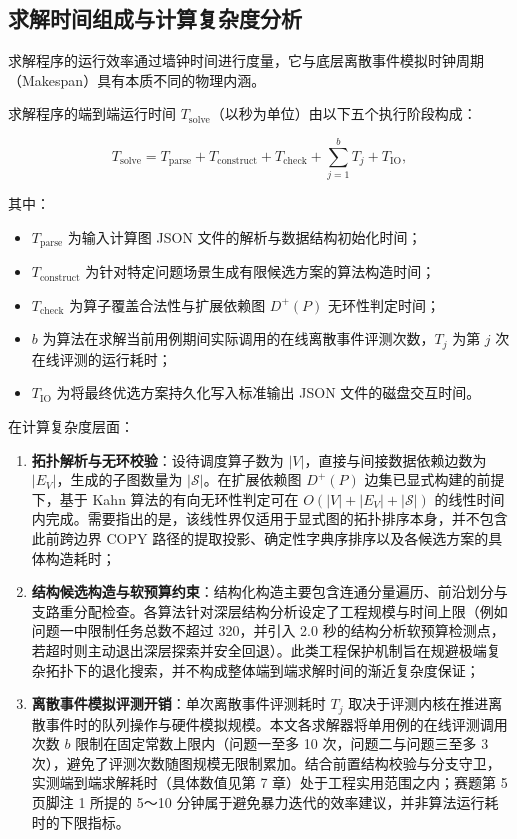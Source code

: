 \documentclass[anonymous,withtoc]{gmcm2026}
\providecommand{\tightlist}{\setlength{\itemsep}{0pt}\setlength{\parskip}{0pt}}
\begin{document}
\subsection{求解时间组成与计算复杂度分析}

求解程序的运行效率通过墙钟时间进行度量，它与底层离散事件模拟时钟周期（Makespan）具有本质不同的物理内涵。

求解程序的端到端运行时间 \(T_{\mathrm{solve}}\)（以秒为单位）由以下五个执行阶段构成：

\begin{equation}
T_{\mathrm{solve}} = T_{\mathrm{parse}} + T_{\mathrm{construct}} + T_{\mathrm{check}} + \sum_{j=1}^{b} T_j + T_{\mathrm{IO}},
\end{equation}

其中：

\begin{itemize}
\tightlist
\item
  \(T_{\mathrm{parse}}\) 为输入计算图 JSON 文件的解析与数据结构初始化时间；
\item
  \(T_{\mathrm{construct}}\) 为针对特定问题场景生成有限候选方案的算法构造时间；
\item
  \(T_{\mathrm{check}}\) 为算子覆盖合法性与扩展依赖图 \(D^+(P)\) 无环性判定时间；
\item
  \(b\) 为算法在求解当前用例期间实际调用的在线离散事件评测次数，\(T_j\) 为第 \(j\) 次在线评测的运行耗时；
\item
  \(T_{\mathrm{IO}}\) 为将最终优选方案持久化写入标准输出 JSON 文件的磁盘交互时间。
\end{itemize}

在计算复杂度层面：

\begin{enumerate}
\def\labelenumi{\arabic{enumi}.}
\tightlist
\item
  \textbf{拓扑解析与无环校验}：设待调度算子数为 \(|V|\)，直接与间接数据依赖边数为 \(|E_V|\)，生成的子图数量为 \(|\mathcal{S}|\)。在扩展依赖图 \(D^+(P)\) 边集已显式构建的前提下，基于 Kahn 算法\cite{ref19}的有向无环性判定可在 \(O(|V| + |E_V| + |\mathcal{S}|)\) 的线性时间内完成。需要指出的是，该线性界仅适用于显式图的拓扑排序本身，并不包含此前跨边界 COPY 路径的提取投影、确定性字典序排序以及各候选方案的具体构造耗时；
\item
  \textbf{结构候选构造与软预算约束}：结构化构造主要包含连通分量遍历、前沿划分与支路重分配检查。各算法针对深层结构分析设定了工程规模与时间上限（例如问题一中限制任务总数不超过 320，并引入 2.0 秒的结构分析软预算检测点，若超时则主动退出深层探索并安全回退）。此类工程保护机制旨在规避极端复杂拓扑下的退化搜索，并不构成整体端到端求解时间的渐近复杂度保证；
\item
  \textbf{离散事件模拟评测开销}：单次离散事件评测耗时 \(T_j\) 取决于评测内核在推进离散事件时的队列操作与硬件模拟规模。本文各求解器将单用例的在线评测调用次数 \(b\) 限制在固定常数上限内（问题一至多 10 次，问题二与问题三至多 3 次），避免了评测次数随图规模无限制累加。结合前置结构校验与分支守卫，实测端到端求解耗时（具体数值见第 7 章）处于工程实用范围之内；赛题第 5 页脚注 1 所提的 5～10 分钟属于避免暴力迭代的效率建议，并非算法运行耗时的下限指标。
\end{enumerate}
\end{document}
